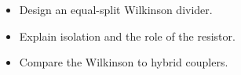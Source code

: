 \begin{objectives}
\begin{itemize}[leftmargin=1.4em,itemsep=2pt]
\item Design an equal-split Wilkinson divider.
\item Explain isolation and the role of the resistor.
\item Compare the Wilkinson to hybrid couplers.
\end{itemize}
\end{objectives}
